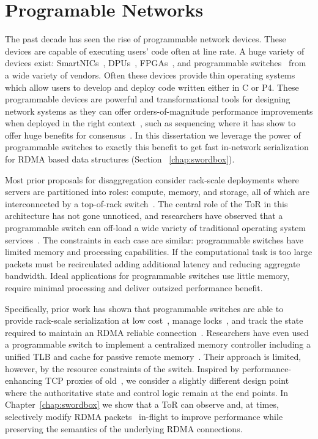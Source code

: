 \documentclass[12pt]{ucsddissertation}
\begin{document}
\section{Programable Networks}
\label{sec:programmable-networks}
The past decade has seen the rise of programmable network devices. These devices are capable of
executing users' code often at line rate. A huge variety of devices exist:
SmartNICs~\cite{fairnic,e3,ipipe,floem}, DPUs~\cite{dsnf},
FPGAs~\cite{azure-smartnic,clio,catapult,supernic}, and programmable
switches~\cite{p4,netchain,netcache,netlock} from a wide variety of vendors. Often these devices
provide thin operating systems which allow users to develop and deploy code written either in C or
P4. These programmable devices are powerful and transformational tools for designing network systems
as they can offer orders-of-magnitude performance improvements when deployed in the right
context~\cite{when-computer}, such as sequencing where it has show to offer huge benefits for
consensus~\cite{eris, nopaxos}. In this dissertation we leverage the power of programmable switches
to exactly this benefit to get fast in-network serialization for RDMA based data structures (Section
~\ref{chap:swordbox}).

Most prior proposals for disaggregation consider rack-scale deployments where
servers are partitioned into roles: compute, memory, and storage, all of which are interconnected by
a top-of-rack switch~\cite{disandapp,the-machine,intel-rack,firebox,legoos}.  The central role of
the ToR in this architecture has not gone unnoticed, and researchers have observed that a
programmable switch can off-load a wide variety of traditional operating system
services~\cite{disandapp,mind,netlock,netkv,netchain,netcache}. The constraints in each case are
similar: programmable switches have limited memory and processing capabilities.  If the
computational task is too large packets must be recirculated adding additional latency and reducing
aggregate bandwidth.  Ideal applications for programmable switches use little memory, require
minimal processing and deliver outsized performance benefit.

Specifically, prior work has shown that programmable switches are able to provide rack-scale
serialization at low cost~\cite{eris,no-paxos,when-computer,Grant2021InContRes}, manage
locks~\cite{netlock}, and track the state required to maintain an RDMA reliable
connection~\cite{tea}. Researchers have even used a programmable switch to implement a centralized
memory controller including a unified TLB and cache for passive remote memory~\cite{mind}.  Their
approach is limited, however, by the resource constraints of the switch.  Inspired by
performance-enhancing TCP proxies of old~\cite{snoop,rfc3135}, we consider a slightly different
design point where the authoritative state and control logic remain at the end points.  In
Chapter~\ref{chap:swordbox} we show that a ToR can observe and, at times, selectively modify RDMA
packets~\cite{switchml,Grant2021InContRes} in-flight to improve performance while preserving the
semantics of the underlying RDMA connections.
\end{document}
